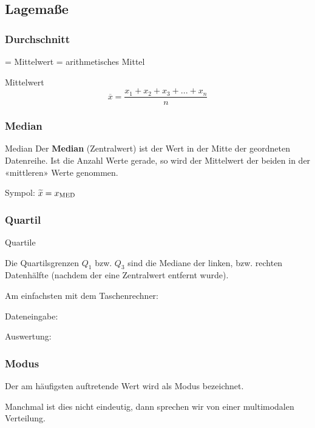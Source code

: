 \begin{multicols}{2}

\subsection*{Lagemaße}
\subsubsection*{Durchschnitt}
= Mittelwert = arithmetisches Mittel

\begin{definition*}{Mittelwert}{}
$$\overline{x} = \frac{x_1 + x_2 + x_3 + ... + x_n}{n}$$
\end{definition*}

\subsubsection*{Median}
\begin{definition*}{Median}{}
Der \textbf{Median} (Zentralwert) ist der Wert in der Mitte der geordneten Datenreihe. Ist
die Anzahl Werte gerade, so wird der Mittelwert der beiden in der
«mittleren» Werte genommen.

Sympol: $\widetilde{x} = x_{\textrm{MED}}$
\end{definition*}

\subsubsection*{Quartil}

\begin{rezept*}{Quartile}{}

Die Quartilsgrenzen $Q_1$ bzw. $Q_3$ sind die Mediane der linken,
bzw. rechten Datenhälfte (nachdem der eine Zentralwert entfernt
wurde).

Am einfachsten mit dem Taschenrechner:

Dateneingabe: 

Auswertung: 
\end{rezept*}

\subsubsection*{Modus}
Der am häufigsten auftretende Wert wird als Modus bezeichnet.

Manchmal ist dies nicht eindeutig, dann sprechen wir von einer
multimodalen Verteilung.


\end{multicols}
